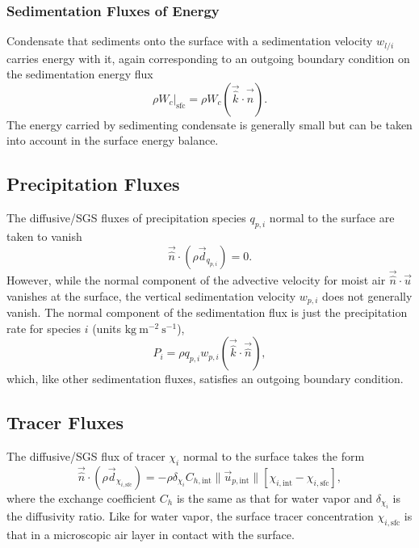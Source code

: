 \documentclass{report}
\begin{document}
\subsubsection{Sedimentation Fluxes of Energy}

Condensate that sediments onto the surface with a sedimentation velocity $w_{l/i}$ carries energy with it, again corresponding to an outgoing boundary condition on the sedimentation energy flux
\[
\left. \rho W_c\right|_\mathrm{sfc} = \rho W_c (\vec{\hat k} \cdot \vec{\hat n}).
\]
The energy carried by sedimenting condensate is generally small but can be taken into account in the surface energy balance.

\subsection{Precipitation Fluxes}

The diffusive/SGS fluxes of precipitation species $q_{p, i}$ normal to the surface are taken to vanish
\begin{equation}\label{e:sfc_precip}
 \vec{\hat n} \cdot (\rho \vec{d}_{q_{p, i}}) = 0.
\end{equation} 
However, while the normal component of the advective velocity for moist air $\vec{\hat n} \cdot \vec{u}$ vanishes at the surface, the vertical sedimentation velocity $w_{p,i}$ does not generally vanish. The normal component of the sedimentation flux is just the precipitation rate for species $i$ (units $\mathrm{kg~m^{-2}~s^{-1}}$),
\begin{equation}
    P_i = \rho q_{p, i} w_{p, i} (\vec{\hat k} \cdot \vec{\hat n}),
\end{equation}
which, like other sedimentation fluxes, satisfies an outgoing boundary condition. 

\subsection{Tracer Fluxes}

The diffusive/SGS flux of tracer $\chi_i$ normal to the surface takes the form 
\begin{equation}\label{e:sfc_tracer}
 \vec{\hat n} \cdot (\rho \vec{d}_{\chi_{i, \mathrm{sfc}}}) = - \rho \delta_{\chi_i} C_{h, \mathrm{int}} \| \vec{u}_{p, \mathrm{int}} \| \left[\chi_{i, \mathrm{int}} - \chi_{i, \mathrm{sfc}} \right],
\end{equation} 
where the exchange coefficient $C_h$ is the same as that for water vapor and $\delta_{\chi_i}$ is the diffusivity ratio. Like for water vapor, the surface tracer concentration $\chi_{i, \mathrm{sfc}}$ is that in a microscopic air layer in contact with the surface.
\end{document}
